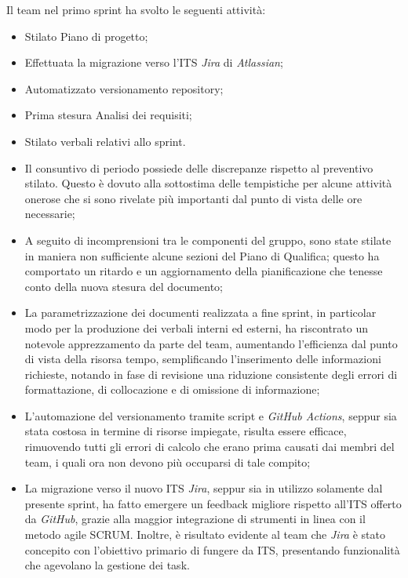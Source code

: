 \documentclass[10pt, a4paper]{article}
\begin{document}
{{{{{{{{{{{{{{{
Il team nel primo sprint ha svolto le seguenti attività:
\begin{itemize}
    \item Stilato Piano di progetto;
    \item Effettuata la migrazione verso l'ITS \textit{Jira} di \textit{Atlassian};
    \item Automatizzato versionamento repository;
    \item Prima stesura Analisi dei requisiti;
    \item Stilato verbali relativi allo sprint.
\end{itemize}
\begin{itemize}
\item Il consuntivo di periodo possiede delle discrepanze rispetto al preventivo stilato. Questo è dovuto alla sottostima delle 
tempistiche per alcune attività onerose che si sono rivelate più importanti dal punto di vista delle ore necessarie;
\item A seguito di incomprensioni tra le componenti del gruppo, sono state stilate in maniera non sufficiente alcune sezioni del 
Piano di Qualifica; questo ha comportato un ritardo e un aggiornamento della pianificazione che tenesse conto della nuova stesura del documento;
\item La parametrizzazione dei documenti realizzata a fine sprint, in particolar modo per la produzione dei verbali interni ed esterni, ha riscontrato un notevole apprezzamento
da parte del team, aumentando l'efficienza dal punto di vista della risorsa tempo, semplificando l'inserimento delle informazioni richieste, notando
in fase di revisione una riduzione consistente degli errori di formattazione, di collocazione e di omissione di informazione;
\item L'automazione del versionamento tramite script e \textit{GitHub Actions}, seppur sia stata costosa in termine di risorse impiegate,
risulta essere efficace, rimuovendo tutti gli errori di calcolo che erano prima causati dai membri del team, i quali ora non devono più occuparsi di tale compito;
\item La migrazione verso il nuovo ITS \textit{Jira}, seppur sia in utilizzo solamente dal presente sprint, ha fatto emergere un feedback migliore rispetto all'ITS 
offerto da \textit{GitHub}, grazie alla maggior integrazione di strumenti in linea con il metodo agile SCRUM. Inoltre, è risultato evidente al team che \textit{Jira} è stato concepito 
con l'obiettivo primario di fungere da ITS, presentando funzionalità che agevolano la gestione dei task.
\end{itemize}
}}}}}}}}}}}}}}}
\end{document}

